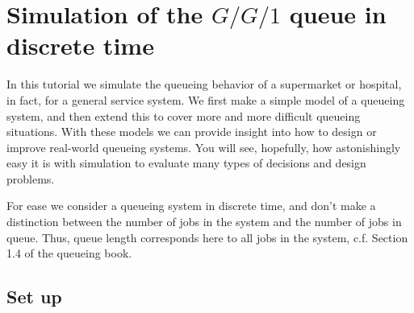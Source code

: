 



\clearpage


\section{Simulation of the $G/G/1$ queue in discrete time}
\label{sec:single-server-queue}

In this tutorial we simulate the queueing behavior of a supermarket or hospital, in fact, for a general service system. We first make a simple model of a queueing system, and then extend this to cover more and more difficult queueing situations. With these models we can provide insight into how to design or improve real-world queueing systems.  You will see, hopefully, how astonishingly easy it is with simulation to evaluate many types of decisions and design problems.  

For ease we  consider a queueing system in discrete time, and don't make a distinction between the number of jobs in the system and the number of jobs in queue. Thus, queue length corresponds here to all jobs in the system, c.f. Section 1.4 of the queueing book. 

\subsection{Set up}
\label{sec:set-up}


